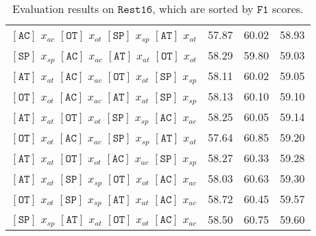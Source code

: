 \documentclass[11pt]{article}
\begin{document}
\begin{table*}[]
\begin{tabular}{c|ccc}
$\mathtt{[AC]}$ $x_{ac}$ $\mathtt{[OT]}$ $x_{ot}$ $\mathtt{[SP]}$ $x_{sp}$ $\mathtt{[AT]}$ $x_{at}$ & 57.87 & 60.02 & 58.93 \\
$\mathtt{[SP]}$ $x_{sp}$ $\mathtt{[AC]}$ $x_{ac}$ $\mathtt{[AT]}$ $x_{at}$ $\mathtt{[OT]}$ $x_{ot}$ & 58.29 & 59.80 & 59.03 \\
$\mathtt{[AT]}$ $x_{at}$ $\mathtt{[AC]}$ $x_{ac}$ $\mathtt{[OT]}$ $x_{ot}$ $\mathtt{[SP]}$ $x_{sp}$ & 58.11 & 60.02 & 59.05 \\
$\mathtt{[OT]}$ $x_{ot}$ $\mathtt{[AC]}$ $x_{ac}$ $\mathtt{[AT]}$ $x_{at}$ $\mathtt{[SP]}$ $x_{sp}$ & 58.13 & 60.10 & 59.10 \\
$\mathtt{[AT]}$ $x_{at}$ $\mathtt{[OT]}$ $x_{ot}$ $\mathtt{[SP]}$ $x_{sp}$ $\mathtt{[AC]}$ $x_{ac}$ & 58.25 & 60.05 & 59.14 \\
$\mathtt{[OT]}$ $x_{ot}$ $\mathtt{[AC]}$ $x_{ac}$ $\mathtt{[SP]}$ $x_{sp}$ $\mathtt{[AT]}$ $x_{at}$ & 57.64 & 60.85 & 59.20 \\
$\mathtt{[AT]}$ $x_{at}$ $\mathtt{[OT]}$ $x_{ot}$ $\mathtt{[AC]}$ $x_{ac}$ $\mathtt{[SP]}$ $x_{sp}$ & 58.27 & 60.33 & 59.28 \\
$\mathtt{[AT]}$ $x_{at}$ $\mathtt{[SP]}$ $x_{sp}$ $\mathtt{[OT]}$ $x_{ot}$ $\mathtt{[AC]}$ $x_{ac}$ & 58.03 & 60.63 & 59.30 \\
$\mathtt{[OT]}$ $x_{ot}$ $\mathtt{[SP]}$ $x_{sp}$ $\mathtt{[AT]}$ $x_{at}$ $\mathtt{[AC]}$ $x_{ac}$ & 58.72 & 60.45 & 59.57 \\
$\mathtt{[SP]}$ $x_{sp}$ $\mathtt{[AT]}$ $x_{at}$ $\mathtt{[OT]}$ $x_{ot}$ $\mathtt{[AC]}$ $x_{ac}$ & 58.50 & 60.75 & 59.60 \\
\bottomrule
    \end{tabular}
    \caption{Evaluation results on $\mathtt{Rest16}$, which are sorted by $\mathtt{F1}$ scores.}
    \label{table:rest16_appendix}
\end{table*}
\end{document}
